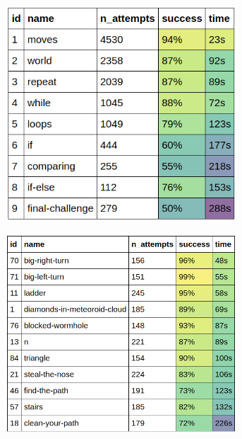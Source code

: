 
\begin{figure}[htb]
\centering
\begin{subfigure}{.48\textwidth}
\centering
\includegraphics[width=0.95\textwidth]{img/monitoring-notebook-levels}
\end{subfigure}
\begin{subfigure}{.51\textwidth}
\centering
\includegraphics[width=0.95\textwidth]{img/monitoring-notebook-repeat}

\end{subfigure}
\end{figure}
